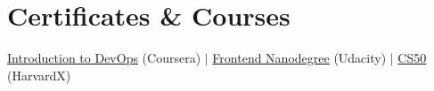 \documentclass[a4paper,11pt]{article}
\begin{document}
\section{Certificates \& Courses}
\begin{itemize}[leftmargin=0.15in, label={}]
  \small{\item{
    \href{https://coursera.org/share/ed24692f08d1a631c923a7ef3b1aeef3}{Introduction to DevOps} (Coursera) $|$
    \href{https://graduation.udacity.com/confirm/e/3ceb7172-c38c-11ed-8abf-2728a0c44453}{Frontend Nanodegree} (Udacity) $|$
    \href{https://drive.google.com/file/d/1KzK0XMcMiYVH0UQgGdkgWTJawjJ4e2Rp/view?usp=sharing}{CS50} (HarvardX)
  }}
\end{itemize}

\end{document}
